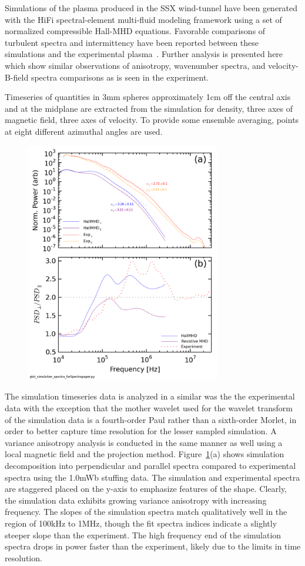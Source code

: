 \documentclass[aip,prl,amsmath,amssymb,reprint,superscriptaddress]{revtex4-1} %
\begin{document}
Simulations of the plasma produced in the SSX wind-tunnel have been generated with the HiFi spectral-element multi-fluid modeling framework using a set of normalized compressible Hall-MHD equations. Favorable comparisons of turbulent spectra and intermittency have been reported between these simulations and the experimental plasma~\cite{schaffner14a}. Further analysis is presented here which show similar observations of anisotropy, wavenumber spectra, and velocity-B-field spectra comparisons as is seen in the experiment.

Timeseries of quantities in 3mm spheres approximately 1cm off the central axis and at the midplane are extracted from the simulation for density, three axes of magnetic field, three axes of velocity. To provide some ensemble averaging, points at eight different azimuthal angles are used.

\begin{figure}[!htbp]
\centerline{
\includegraphics[width=8.5cm]{Anisotropy_simulation_comparison}}
\caption{\label{fig:aniso_comp}}
\end{figure}

The simulation timeseries data is analyzed in a similar was the the experimental data with the exception that the mother wavelet used for the wavelet transform of the simulation data is a fourth-order Paul rather than a sixth-order Morlet, in order to better capture time resolution for the lesser sampled simulation. A variance anisotropy analysis is conducted in the same manner as well using a local magnetic field and the projection method. Figure~\ref{fig:aniso_comp}(a) shows simulation decomposition into perpendicular and parallel spectra compared to experimental spectra using the 1.0mWb stuffing data. The simulation and experimental spectra are staggered placed on the y-axis to emphasize features of the shape. Clearly, the simulation data exhibits growing variance anisotropy with increasing frequency. The slopes of the simulation spectra match qualitatively well in the region of 100kHz to 1MHz, though the fit spectra indices indicate a slightly steeper slope than the experiment. The high frequency end of the simulation spectra drops in power faster than the experiment, likely due to the limits in time resolution.
\end{document}
